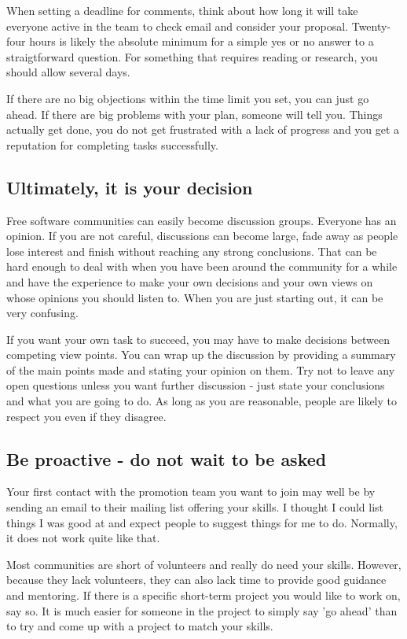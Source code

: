 When setting a deadline for comments, think about how long it will take everyone active in the team to check email and consider your proposal. Twenty-four hours is likely the absolute minimum for a simple yes or no answer to a straigtforward question. For something that requires reading or research, you should allow several days.

If there are no big objections within the time limit you set, you can just go ahead. If there are big problems with your plan, someone will tell you. Things actually get done, you do not get frustrated with a lack of progress and you get a reputation for completing tasks successfully.

\subsection*{Ultimately, it is your decision}

Free software communities can easily become discussion groups. Everyone has an opinion. If you are not careful, discussions can become large, fade away as people lose interest and finish without reaching any strong conclusions. That can be hard enough to deal with when you have been around the community for a while and have the experience to make your own decisions and your own views on whose opinions you should listen to. When you are just starting out, it can be very confusing.

If you want your own task to succeed, you may have to make decisions between competing view points. You can wrap up the discussion by providing a summary of the main points made and stating your opinion on them. Try not to leave any open questions unless you want further discussion - just state your conclusions and what you are going to do. As long as you are reasonable, people are likely to respect you even if they disagree.

\subsection*{Be proactive - do not wait to be asked}

Your first contact with the promotion team you want to join may well be by sending an email to their mailing list offering your skills. I thought I could list things I was good at and expect people to suggest things for me to do. Normally, it does not work quite like that.

Most communities are short of volunteers and really do need your skills. However, because they lack volunteers, they can also lack time to provide good guidance and mentoring. If there is a specific short-term project you would like to work on, say so. It is much easier for someone in the project to simply say 'go ahead' than to try and come up with a project to match your skills.


